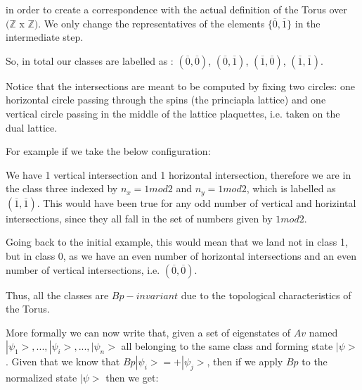 \documentclass[12pt]{report}
\begin{document}
	
	
	
	
	\begin{minipage}{1 \textwidth}
		
		in order to create a correspondence with the actual definition of the Torus over $(\mathbb{Z}$ x $\mathbb{Z})$. 
		We only change the representatives of the elements $\{\overline{0},\overline{1} \}$ in the intermediate step. \newline
		
		So, in total our classes are labelled as : $(\overline{0},\overline{0} )$, $(\overline{0},\overline{1} )$, $(\overline{1},\overline{0})$, $(\overline{1},\overline{1})$.\newline
		
		Notice that the intersections are meant to be computed by fixing two circles: one horizontal circle passing through the spins (the princiapla lattice) and one vertical circle passing in the middle of the lattice plaquettes, i.e. taken on the dual lattice.\newline
		 
		For example if we take the below configuration: \newline
		
		
		We have 1 vertical intersection and 1 horizontal intersection, therefore we are in the class three indexed by $n_x=1mod2$ and $n_y=1mod2$, which is labelled as $(\overline{1},\overline{1})$. This would have been true for any odd number of vertical and horizintal intersections, since they all fall in the set of numbers given by $1mod2$.\newline
		
		Going back to the initial example, this would mean that we land not in class 1, but in class 0, as we have an even number of horizontal intersections and an even number of vertical intersections, i.e.   $(\overline{0}, \overline{0})$.\newline
		
		Thus, all the classes are $Bp-invariant$ due to the topological characteristics of the Torus.\newline
		
		More formally we can now write that, given a set of eigenstates of $Av$ named $|\psi_1>,...,|\psi_i>,...,|\psi_n>$ all belonging to the same class and forming state $|\psi>$. Given that we know that $Bp|\psi_i>=+|\psi_j>$, then if we apply $Bp$ to the normalized state $|\psi>$ then we get:
		

\end{minipage}
\end{document}
